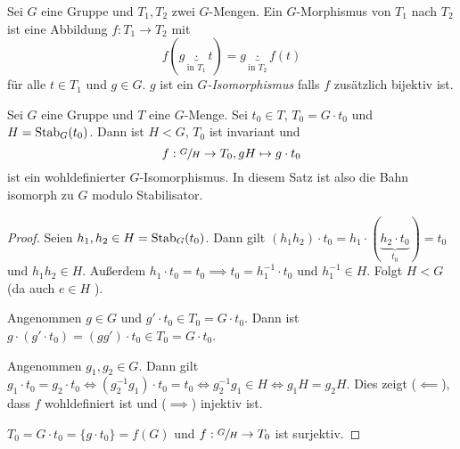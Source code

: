 \begin{definition}
	Sei $G$ eine Gruppe und $T_1, T_2$ zwei $G$-Mengen.
	Ein $G$-Morphismus von $T_1$ nach $T_2$ ist eine Abbildung $f: T_1 \to T_2$ mit
	\[
		f(g \underbrace{\cdot }_{\text{in } T_1} t) = g \underbrace{\cdot}_{\text{in } T_2} f(t)
	\]
	für alle $t \in T_1$ und $g \in G$.
	$g$ ist ein \emph{$G$-Isomorphismus} falls $f$ zusätzlich bijektiv ist.
\end{definition}

\begin{theorem}
	Sei $G$ eine Gruppe und $T$ eine $G$-Menge.
	Sei $t_0 \in T$, $T_0 = G \cdot t_0$ und $H = \operatorname{Stab}_{G}(t_0)$.
	Dann ist $H < G$, $T_0$ ist invariant und 
	\[
		f: \sfrac{G}{H} \to T_0, gH \mapsto g\cdot t_0
	\]
	ist ein wohldefinierter $G$-Isomorphismus.
	In diesem Satz ist also die Bahn isomorph zu $G$ modulo Stabilisator.
\end{theorem}

\begin{proof}
	Seien $h_1,h_2 \in H = \operatorname{Stab}_{G}(t_0)$. Dann gilt $(h_1 h_2) \cdot t_0 = h_1 \cdot (\underbrace{h_2 \cdot t_0}_{t_0}) = t_0$ und $h_1 h_2 \in H$.
	Außerdem $h_1 \cdot t_0 = t_0 \implies t_0 = h_1^{-1} \cdot t_0$ und $h_1^{-1} \in H$. Folgt $H < G$ (da auch $e \in H$ ).
	
	Angenommen $g \in G$ und $g' \cdot t_0 \in T_0 = G \cdot t_0$.
	Dann ist $g \cdot (g' \cdot t_0) = (g g') \cdot t_0 \in T_0 = G \cdot t_0$.

	Angenommen $g_1, g_2 \in G$. Dann gilt $g_1 \cdot t_0 = g_2 \cdot t_0 \Leftrightarrow (g_2^{-1} g_1) \cdot t_0 = t_0 \Leftrightarrow g_2^{-1} g_1 \in H \Leftrightarrow g_1H = g_2 H$.
	Dies zeigt ($\impliedby$), dass $f$ wohldefiniert ist und ($\implies$) injektiv ist.

	$T_0 = G \cdot t_0 = \{g \cdot t_0\}  = f(G)$ und $f: \sfrac{G}{H} \to T_0$ ist surjektiv.
\end{proof}





































